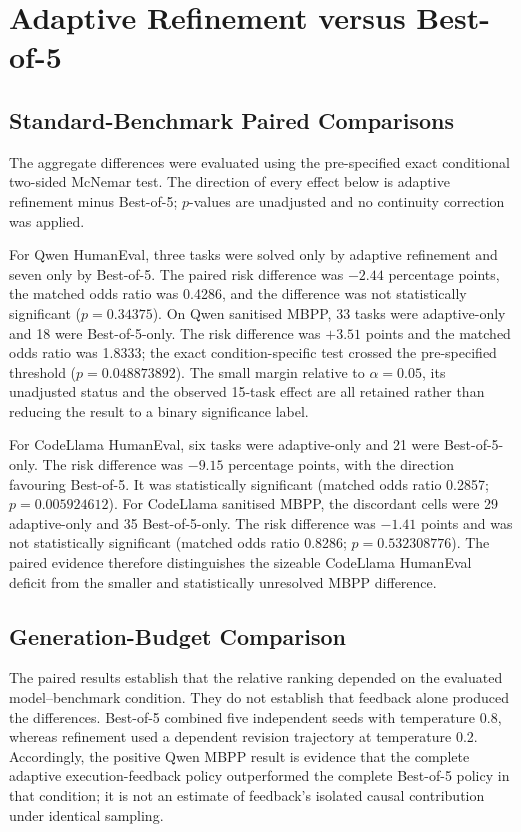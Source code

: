 \section{Adaptive Refinement versus Best-of-5}

\subsection{Standard-Benchmark Paired Comparisons}

The aggregate differences were evaluated using the pre-specified exact conditional two-sided McNemar test. The direction of every effect below is adaptive refinement minus Best-of-5; $p$-values are unadjusted and no continuity correction was applied.

For Qwen HumanEval, three tasks were solved only by adaptive refinement and seven only by Best-of-5. The paired risk difference was $-2.44$ percentage points, the matched odds ratio was 0.4286, and the difference was not statistically significant ($p=0.34375$). On Qwen sanitised MBPP, 33 tasks were adaptive-only and 18 were Best-of-5-only. The risk difference was $+3.51$ points and the matched odds ratio was 1.8333; the exact condition-specific test crossed the pre-specified threshold ($p=0.048873892$). The small margin relative to $\alpha=0.05$, its unadjusted status and the observed 15-task effect are all retained rather than reducing the result to a binary significance label.

For CodeLlama HumanEval, six tasks were adaptive-only and 21 were Best-of-5-only. The risk difference was $-9.15$ percentage points, with the direction favouring Best-of-5. It was statistically significant (matched odds ratio 0.2857; $p=0.005924612$). For CodeLlama sanitised MBPP, the discordant cells were 29 adaptive-only and 35 Best-of-5-only. The risk difference was $-1.41$ points and was not statistically significant (matched odds ratio 0.8286; $p=0.532308776$). The paired evidence therefore distinguishes the sizeable CodeLlama HumanEval deficit from the smaller and statistically unresolved MBPP difference.

\subsection{Generation-Budget Comparison}

The paired results establish that the relative ranking depended on the evaluated model--benchmark condition. They do not establish that feedback alone produced the differences. Best-of-5 combined five independent seeds with temperature 0.8, whereas refinement used a dependent revision trajectory at temperature 0.2. Accordingly, the positive Qwen MBPP result is evidence that the complete adaptive execution-feedback policy outperformed the complete Best-of-5 policy in that condition; it is not an estimate of feedback's isolated causal contribution under identical sampling.

